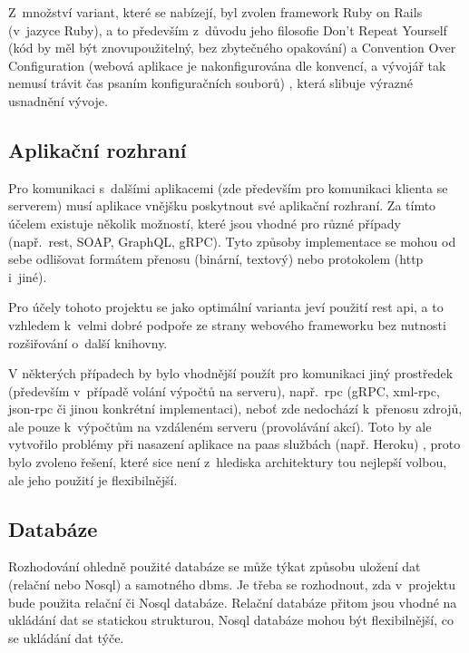 \documentclass[a4paper,11pt,openany,twoside]{book}
\begin{document}
Z~množství variant, které se nabízejí, byl zvolen framework Ruby on Rails (v~jazyce Ruby), a to především z~důvodu jeho filosofie Don't Repeat Yourself (kód by měl být znovupoužitelný, bez zbytečného opakování) a Convention Over Configuration (webová aplikace je nakonfigurována dle konvencí, a vývojář tak nemusí trávit čas psaním konfiguračních souborů) \cite{rails2020}, která slibuje výrazné usnadnění vývoje.

\subsection{Aplikační rozhraní}

Pro komunikaci s~dalšími aplikacemi (zde především pro komunikaci klienta se serverem) musí aplikace vnějšku poskytnout své aplikační rozhraní. Za tímto účelem existuje několik možností, které jsou vhodné pro různé případy (např.~\acs{rest}, SOAP, GraphQL, gRPC). Tyto způsoby implementace se mohou od sebe odlišovat formátem přenosu (binární, textový) nebo protokolem (\acs{http} i~jiné).

Pro účely tohoto projektu se jako optimální varianta jeví použití \acs{rest} \acs{api}, a to vzhledem k~velmi dobré podpoře ze strany webového frameworku bez nutnosti rozšiřování o~další knihovny. %

V některých případech by bylo vhodnější použít pro komunikaci jiný prostředek (především v~případě volání výpočtů na serveru), např.~\acs{rpc} (gRPC, \acs{xml}-\acs{rpc}, \acs{json}-\acs{rpc} či jinou konkrétní implementaci), neboť zde nedochází k~přenosu zdrojů, ale pouze k~výpočtům na vzdáleném serveru (provolávání akcí). \cite{sturgeon2016understanding} Toto by ale vytvořilo problémy při nasazení aplikace na \acs{paas} službách (např. Heroku) \cite{lisitsky2018does}, proto bylo zvoleno řešení, které sice není z~hlediska architektury tou nejlepší volbou, ale jeho  použití je flexibilnější.

\subsection{Databáze}

Rozhodování ohledně použité databáze se může týkat způsobu uložení dat (relační nebo No\acs{sql}) a samotného \acs{dbms}. Je třeba se rozhodnout, zda v~projektu bude použita relační či No\acs{sql} databáze. Relační databáze přitom jsou vhodné na ukládání dat se statickou strukturou, No\acs{sql} databáze mohou být flexibilnější, co se ukládání dat týče.  \cite{geeks2020difference}
\end{document}
